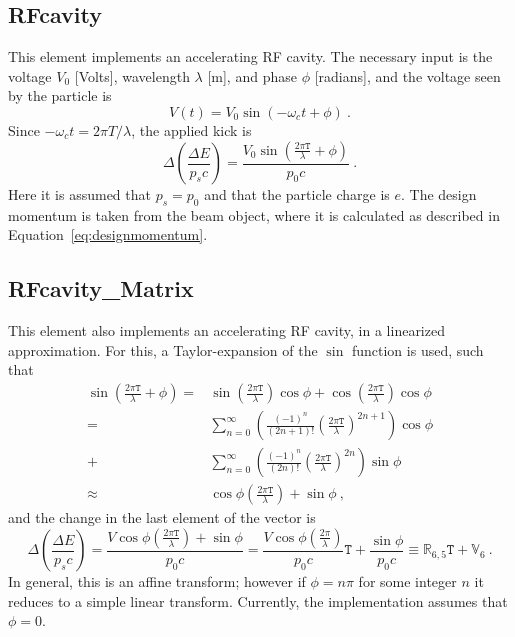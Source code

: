 \documentclass[a4paper]{report}
\begin{document}
\subsection{RFcavity}
\label{sec:elements:RFcavity}

This element implements an accelerating RF cavity.
The necessary input is the voltage $V_0$ [Volts], wavelength $\lambda$ [m], and phase $\phi$ [radians], and the voltage seen by the particle is
\begin{equation}
  V(t) = V_0 \sin\left( -\omega_c t + \phi \right)~.
\end{equation}
Since $ -\omega_c t = 2\pi T / \lambda$, the applied kick is 
\begin{equation}
  \Delta \left(\frac{\Delta E}{p_s c}\right) = \frac{V_0 \sin\left(\frac{2\pi \mathtt{T} }{\lambda}+\phi\right)}{p_0 c}~.
\end{equation}
Here it is assumed that $p_s = p_0$ and that the particle charge is $e$.
The design momentum is taken from the beam object, where it is calculated as described in Equation~\eqref{eq:designmomentum}.



\subsection{RFcavity\_Matrix}

This element also implements an accelerating RF cavity, in a linearized approximation.
For this, a Taylor-expansion of the $\sin$ function is used, such that
\begin{equation}
  \begin{split}
    \sin\left(\frac{2\pi \mathtt{T} }{\lambda}+\phi\right) =& \sin\left(\frac{2\pi \mathtt{T} }{\lambda}\right)\cos\phi + \cos\left(\frac{2\pi \mathtt{T} }{\lambda}\right)\cos\phi \\
    =&
    \sum_{n=0}^\infty \left( \frac{(-1)^n}{(2n+1)!} \left(\frac{2\pi \mathtt{T}}{\lambda}\right)^{2n+1} \right) \cos\phi \\
    +& 
    \sum_{n=0}^\infty \left( \frac{(-1)^n}{(2n)!} \left(\frac{2\pi \mathtt{T}}{\lambda}\right)^{2n} \right) \sin\phi \\
    \approx& \cos\phi \left(\frac{2\pi \mathtt{T}}{\lambda}\right) + \sin\phi ~,
  \end{split}
\end{equation}
and the change in the last element of the vector is
\begin{equation}
  \Delta \left(\frac{\Delta E}{p_s c}\right) = \frac{V \cos\phi \left(\frac{2\pi \mathtt{T}}{\lambda}\right) + \sin\phi}{p_0 c} = \frac{V \cos\phi \left(\frac{2\pi }{\lambda}\right)}{p_0 c} \mathtt{T} + \frac{\sin\phi}{p_0c} \equiv \mathbb{R}_{6,5} \mathtt{T} + \mathbb{V}_6 ~.
\end{equation}
In general, this is an affine transform; however if $\phi = n\pi$ for some integer $n$ it reduces to a simple linear transform. Currently, the implementation assumes that $\phi = 0$.
\end{document}
